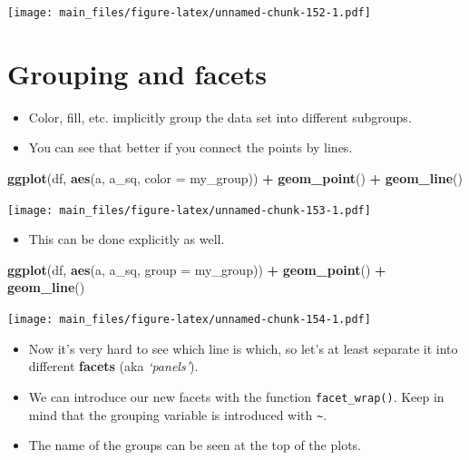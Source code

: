 \documentclass[
]{book}
\newenvironment{Shaded}{\begin{snugshade}}{\end{snugshade}}
\newcommand{\AttributeTok}[1]{\textcolor[rgb]{0.13,0.29,0.53}{#1}}
\newcommand{\FunctionTok}[1]{\textcolor[rgb]{0.13,0.29,0.53}{\textbf{#1}}}
\newcommand{\NormalTok}[1]{#1}
\newcommand{\SpecialCharTok}[1]{\textcolor[rgb]{0.81,0.36,0.00}{\textbf{#1}}}
\providecommand{\tightlist}{%
  \setlength{\itemsep}{0pt}\setlength{\parskip}{0pt}}
\begin{document}
\texttt{[image: main\_files/figure-latex/unnamed-chunk-152-1.pdf]}

\section{Grouping and facets}\label{grouping-and-facets}

\begin{itemize}
\tightlist
\item
  Color, fill, etc. implicitly group the data set into different subgroups.
\item
  You can see that better if you connect the points by lines.
\end{itemize}

\begin{Shaded}
\begin{Highlighting}[]
\FunctionTok{ggplot}\NormalTok{(df, }\FunctionTok{aes}\NormalTok{(a, a\_sq, }\AttributeTok{color =}\NormalTok{ my\_group)) }\SpecialCharTok{+} \FunctionTok{geom\_point}\NormalTok{()  }\SpecialCharTok{+} \FunctionTok{geom\_line}\NormalTok{()}
\end{Highlighting}
\end{Shaded}

\texttt{[image: main\_files/figure-latex/unnamed-chunk-153-1.pdf]}

\begin{itemize}
\tightlist
\item
  This can be done explicitly as well.
\end{itemize}

\begin{Shaded}
\begin{Highlighting}[]
\FunctionTok{ggplot}\NormalTok{(df, }\FunctionTok{aes}\NormalTok{(a, a\_sq, }\AttributeTok{group =}\NormalTok{ my\_group)) }\SpecialCharTok{+} \FunctionTok{geom\_point}\NormalTok{()  }\SpecialCharTok{+} \FunctionTok{geom\_line}\NormalTok{()}
\end{Highlighting}
\end{Shaded}

\texttt{[image: main\_files/figure-latex/unnamed-chunk-154-1.pdf]}

\begin{itemize}
\tightlist
\item
  Now it's very hard to see which line is which, so let's at least separate it into different \textbf{facets} (aka \emph{`panels'}).
\item
  We can introduce our new facets with the function \texttt{facet\_wrap()}. Keep in mind that the grouping variable is introduced with \texttt{\textasciitilde{}}.
\item
  The name of the groups can be seen at the top of the plots.
\end{itemize}
\end{document}
